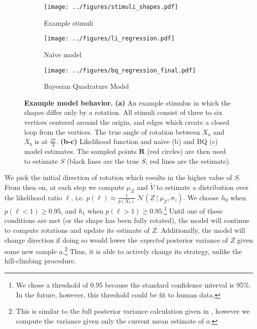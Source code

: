 \documentclass{article} %
\newcommand{\naive}[0]{na\"ive}
\newcommand{\Naive}[0]{Na\"ive}
\begin{document}
\begin{figure}[t]
  \centering
  \begin{subfigure}[b]{0.32\textwidth}
    \centering
    \texttt{[image: ../figures/stimuli\_shapes.pdf]}
    \vspace{0pt}
    \caption{Example stimuli}
    \label{fig:stimuli}
  \end{subfigure}
  \begin{subfigure}[b]{0.32\textwidth}
    \centering
    \texttt{[image: ../figures/li\_regression.pdf]}
    \caption{\Naive{} model}
    \label{fig:li}
  \end{subfigure}
  \begin{subfigure}[b]{0.32\textwidth}
    \centering
    \texttt{[image: ../figures/bq\_regression\_final.pdf]}
    \caption{Bayesian Quadrature Model}
    \vspace{0pt}
    \label{fig:bq}
  \end{subfigure}
  \caption{\textbf{Example model behavior.} \textbf{(a)} An example
    stimulus in which the shapes differ only by a rotation. All
    stimuli consist of three to six vertices centered around the
    origin, and edges which create a closed loop from the
    vertices. The true angle of rotation between $X_a$ and $X_b$ is at
    $\frac{2\pi}{3}$. \textbf{(b-c)} Likelihood function and \naive{}
    (b) and BQ (c) model estimates. The sampled points $\mathbf{R}$
    (red circles) are then used to estimate $S$ (black lines are the
    true $S$, red lines are the estimate).}
  \label{fig:shapes}
\end{figure}

We pick the initial direction of rotation which results in the higher
value of $S$. From then on, at each step we compute $\mu_Z$ and
$\tilde{V}$ to estimate a distribution over the likelihood ratio
$\ell$, i.e.  $p(\ell)\approx\frac{1}{p(X_b)}\ \mathcal{N}(Z\ \vert\
\mu_Z, \sigma_z)$.  We choose $h_0$ when $p(\ell < 1)\geq 0.95$, and
$h_1$ when $p(\ell > 1)\geq 0.95$.\footnote{We chose a threshold of
  0.95 because the standard confidence interval is 95\%. In the
  future, however, this threshold could be fit to human data.} Until
one of these conditions are met (or the shape has been fully rotated),
the model will continue to compute rotations and update its estimate
of $Z$.  Additionally, the model will change direction if doing so
would lower the \textit{expected} posterior variance of $Z$ given some
new sample $a$.\footnote{This is similar to the full posterior
  variance calculation given in \cite{Osborne:2012tm}, however we
  compute the variance given only the current mean estimate of $a$.}
Thus, it is able to actively change its strategy, unlike the
hill-climbing procedure.
\end{document}
